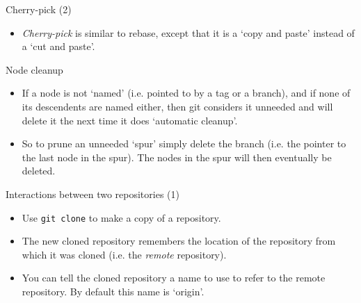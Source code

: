 \documentclass[usenames,dvipsnames]{beamer}
\newcommand{\code}[1]{\colorbox{light-gray}{\texttt{#1}}}
\begin{document}
\begin{frame}{Cherry-pick (2)}
  \begin{block}{}
    \begin{itemize}
      \item{\textit{Cherry-pick} is similar to rebase, except that it is a `copy and paste' instead of a `cut and paste'.}
    \end{itemize}
  \end{block}
\end{frame}



\begin{frame}{Node cleanup}
  \begin{block}{}
    \begin{itemize}
      \item{If a node is not `named' (i.e. pointed to by a tag or a branch), and if none of its descendents are named either, then git considers it unneeded and will delete it the next time it does `automatic cleanup'.}
      \item{So to prune an unneeded `spur' simply delete the branch (i.e. the pointer to the last node in the spur). The nodes in the spur will then eventually be deleted.}
    \end{itemize}
  \end{block}
\end{frame}

\begin{frame}{Interactions between two repositories (1)}
  \begin{block}{}
    \begin{itemize}
      \item{Use \code{git clone} to make a copy of a repository.}
      \item{The new cloned repository remembers the location of the repository from which it was cloned (i.e. the \textit{remote} repository).}
      \item{You can tell the cloned repository a name to use to refer to the remote repository. By default this name is `origin'.}
    \end{itemize}
  \end{block}
\end{frame}
\end{document}
